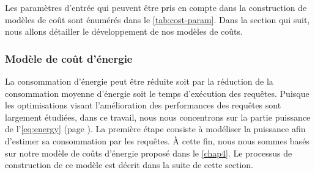 Les paramètres d'entrée qui peuvent être pris en compte dans la construction de modèles de coût sont énumérés dans le \ref{tab:cost-param}. Dans la section qui suit, nous allons détailler le développement de nos modèles de coûts.

\subsubsection{Modèle de coût d'énergie}\label{subsec:PowerCostModel}
La consommation d'énergie peut être réduite soit par la réduction de la consommation moyenne d'énergie soit le temps d'exécution des requêtes. Puisque les optimisations visant l'amélioration des performances des requêtes sont largement étudiées, dans ce travail, nous nous concentrons sur la partie puissance de l'\ref{eq:energy} (page \pageref{eq:energy}). La première étape consiste à modéliser la puissance afin d'estimer sa consommation par les requêtes. À cette fin, nous nous sommes basés sur notre modèle de coûts d'énergie proposé dans le \ref{chap4}. Le processus de construction de ce modèle est décrit dans la suite de cette section.

